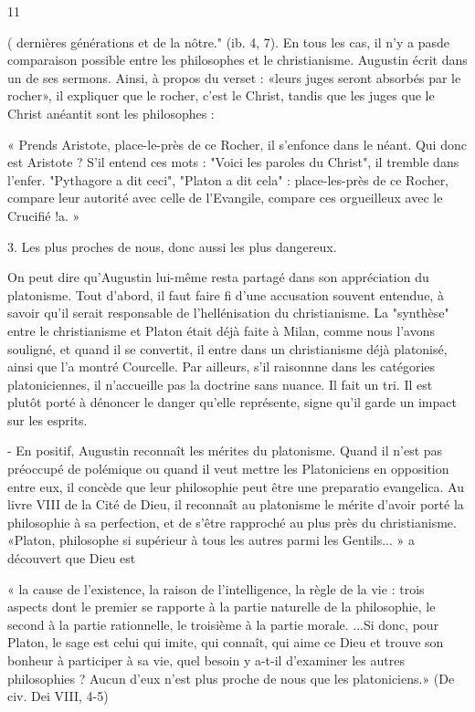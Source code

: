 11
 
(
dernières générations et  de la nôtre." (ib. 4, 7). En tous les cas, il n'y a pasde
comparaison possible entre les philosophes et le christianisme. Augustin écrit dans un de ses sermons. Ainsi, à propos du verset : «leurs juges seront absorbés par le rocher», il expliquer que le rocher, c'est le Christ, tandis que les juges que le Christ anéantit sont les philosophes :

« Prends Aristote, place-le-près de ce Rocher, il s'enfonce dans le néant. Qui donc est Aristote ? S'il entend ces mots : "Voici les paroles du Christ", il tremble dans l'enfer. "Pythagore a dit ceci", "Platon a dit cela" : place-les-près de ce Rocher, compare leur autorité avec celle de l'Evangile, compare ces orgueilleux avec le Crucifié !a. »

3.	Les plus proches de nous, donc aussi les plus dangereux.

On peut dire qu'Augustin lui-même resta partagé dans son appréciation du platonisme. Tout d'abord, il faut faire fi d'une accusation souvent entendue, à savoir qu'il serait responsable de l'hellénisation du christianisme. La "synthèse" entre le christianisme et Platon était déjà faite à Milan, comme nous l'avons souligné, et quand il se convertit, il entre dans un christianisme déjà platonisé, ainsi que l'a montré Courcelle. Par ailleurs, s'il raisonnne dans les catégories platoniciennes, il n'accueille pas la doctrine sans nuance. Il fait un tri. Il est plutôt porté à dénoncer le danger qu'elle représente, signe qu'il garde un impact sur les esprits.

-	En positif, Augustin reconnaît les mérites du platonisme. Quand il n'est pas préoccupé de polémique ou quand il veut mettre les Platoniciens en opposition entre eux, il concède que leur philosophie peut être une preparatio  evangelica. Au livre VIII de la Cité de Dieu, il reconnaît au platonisme le mérite d'avoir porté la philosophie à sa perfection, et de s'être rapproché au plus près du christianisme.
«Platon, philosophe si supérieur à tous les autres parmi les Gentils... » a découvert
que Dieu est

« la cause de l'existence, la raison de l'intelligence, la règle de la vie : trois aspects dont le premier se rapporte à la partie naturelle de la philosophie, le second à la partie rationnelle, le troisième à la partie morale. ...Si donc, pour Platon, le sage est celui qui imite, qui connaît, qui aime ce Dieu et trouve son bonheur à participer à sa vie, quel besoin y a-t-il d'examiner les autres philosophies ? Aucun d'eux n'est plus proche de nous que les platoniciens.» (De civ. Dei VIII, 4-5)

